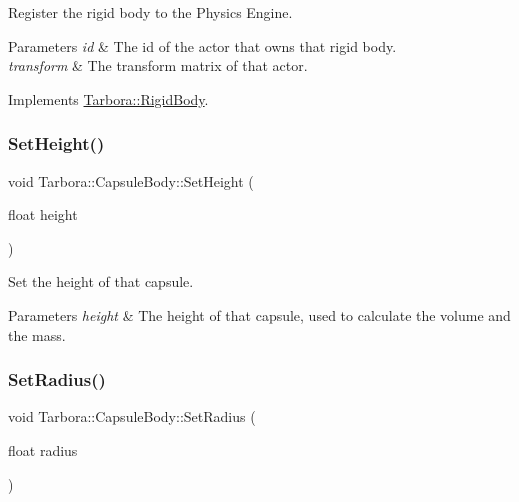 Register the rigid body to the Physics Engine. 


\begin{DoxyParams}{Parameters}
{\em id} & The id of the actor that owns that rigid body. \\
\hline
{\em transform} & The transform matrix of that actor. \\
\hline
\end{DoxyParams}


Implements \hyperlink{classTarbora_1_1RigidBody_a5f41c214aabe2a7f069a317cb755f0f1}{Tarbora\+::\+Rigid\+Body}.

\mbox{\label{classTarbora_1_1CapsuleBody_a8d9cf25e8ce8cf0d180b67b2063f94f2}} 
\subsubsection{\texorpdfstring{Set\+Height()}{SetHeight()}}
{\footnotesize\ttfamily void Tarbora\+::\+Capsule\+Body\+::\+Set\+Height (\begin{DoxyParamCaption}\item[{float}]{height }\end{DoxyParamCaption})\hspace{0.3cm}{\ttfamily [inline]}}



Set the height of that capsule. 


\begin{DoxyParams}{Parameters}
{\em height} & The height of that capsule, used to calculate the volume and the mass. \\
\hline
\end{DoxyParams}
\mbox{\label{classTarbora_1_1CapsuleBody_ace07a924c2dd8830983b056a07813530}} 
\subsubsection{\texorpdfstring{Set\+Radius()}{SetRadius()}}
{\footnotesize\ttfamily void Tarbora\+::\+Capsule\+Body\+::\+Set\+Radius (\begin{DoxyParamCaption}\item[{float}]{radius }\end{DoxyParamCaption})\hspace{0.3cm}{\ttfamily [inline]}}



